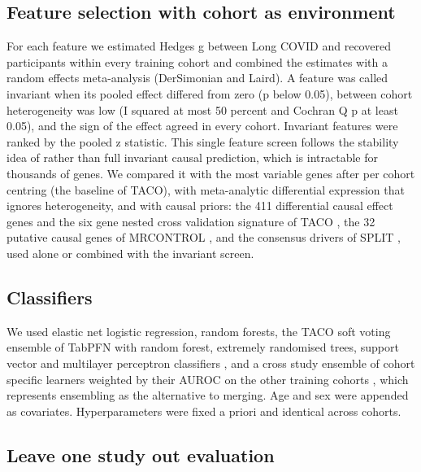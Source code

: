 \documentclass[unnumsec,webpdf,contemporary,large]{oup-authoring-template}
\begin{document}
\subsection{Feature selection with cohort as environment}\label{sec:selection}

For each feature we estimated Hedges g between Long COVID and recovered participants within every training cohort and combined the estimates with a random effects meta-analysis (DerSimonian and Laird). A feature was called invariant when its pooled effect differed from zero (p below 0.05), between cohort heterogeneity was low (I squared at most 50 percent and Cochran Q p at least 0.05), and the sign of the effect agreed in every cohort. Invariant features were ranked by the pooled z statistic. This single feature screen follows the stability idea of \citet{pfister2021} rather than full invariant causal prediction, which is intractable for thousands of genes. We compared it with the most variable genes after per cohort centring (the baseline of TACO), with meta-analytic differential expression that ignores heterogeneity, and with causal priors: the 411 differential causal effect genes and the six gene nested cross validation signature of TACO \citep{pinero2026taco}, the 32 putative causal genes of MRCONTROL \citep{pinero2025mrcontrol}, and the consensus drivers of SPLIT \citep{pinero2026split}, used alone or combined with the invariant screen.

\subsection{Classifiers}

We used elastic net logistic regression, random forests, the TACO soft voting ensemble of TabPFN with random forest, extremely randomised trees, support vector and multilayer perceptron classifiers \citep{pinero2026taco,hollmann2025}, and a cross study ensemble of cohort specific learners weighted by their AUROC on the other training cohorts \citep{patil2018}, which represents ensembling as the alternative to merging. Age and sex were appended as covariates. Hyperparameters were fixed a priori and identical across cohorts.

\subsection{Leave one study out evaluation}
\end{document}
